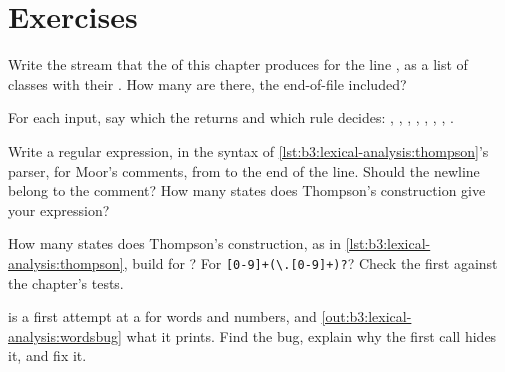 \section{Exercises}\label{sec:b3:lexical-analysis:exercises}

\begin{exercise}[$\star$]\label{exo:b3:lexical-analysis:1}
Write the  stream that the  of this chapter produces for the line , as a list of classes with their . How many  are there, the end-of-file  included?
\end{exercise}

\begin{exercise}[$\star$]\label{exo:b3:lexical-analysis:2}
For each input, say which  the  returns and which rule decides: , , , \code{<=}, \code{<==}, , \code{->-}, .
\end{exercise}

\begin{exercise}[$\star$]\label{exo:b3:lexical-analysis:3}
Write a regular expression, in the syntax of \cref{lst:b3:lexical-analysis:thompson}'s parser, for Moor's comments, from \code{//} to the end of the line. Should the newline belong to the comment? How many states does Thompson's construction give your expression?
\end{exercise}

\begin{exercise}[$\star$]\label{exo:b3:lexical-analysis:4}
How many states does Thompson's construction, as in \cref{lst:b3:lexical-analysis:thompson}, build for ? For \texttt{[0-9]+(\textbackslash.[0-9]+)?}? Check the first against the chapter's tests.
\end{exercise}

\begin{exercise}[$\star\star$]\label{exo:b3:lexical-analysis:5}
 is a first attempt at a  for words and numbers, and \cref{out:b3:lexical-analysis:wordsbug} what it prints. Find the bug, explain why the first call hides it, and fix it.
\label{lst:b3:lexical-analysis:wordsbug}
\label{out:b3:lexical-analysis:wordsbug}
\end{exercise}


